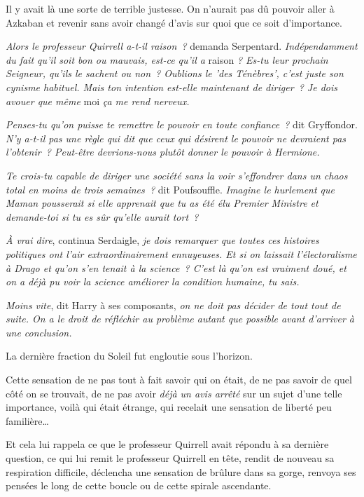 Il y avait là une sorte de terrible justesse. On n'aurait pas dû pouvoir aller à Azkaban et revenir sans avoir changé d'avis sur quoi que ce soit d'importance.

\emph{Alors le professeur Quirrell a-t-il raison~?} demanda Serpentard. \emph{Indépendamment du fait qu'il soit bon ou mauvais, est-ce qu'il a} raison \emph{? Es-tu leur prochain Seigneur, qu'ils le sachent ou non~? Oublions le 'des Ténèbres', c'est juste son cynisme habituel. Mais ton intention est-elle maintenant de diriger~? Je dois avouer que même} moi \emph{ça me rend nerveux.}

\emph{Penses-tu qu'on puisse te remettre le pouvoir en toute confiance~?} dit Gryffondor. \emph{N'y a-t-il pas une règle qui dit que ceux qui désirent le pouvoir ne devraient pas l'obtenir~? Peut-être devrions-nous plutôt donner le pouvoir à Hermione.}

\emph{Te crois-tu capable de diriger une société sans la voir s'effondrer dans un chaos total en moins de trois semaines~?} dit Poufsouffle. \emph{Imagine le hurlement que Maman pousserait si elle apprenait que tu as été élu Premier Ministre et demande-toi si tu es sûr qu'elle aurait tort~?}

\emph{À vrai dire}, continua Serdaigle, \emph{je dois remarquer que toutes ces histoires politiques ont l'air extraordinairement ennuyeuses. Et si on laissait l'électoralisme à Drago et qu'on s'en tenait à la science~? C'est là qu'on est vraiment doué, et on a déjà pu voir la science améliorer la condition humaine, tu sais.}

\emph{Moins vite}, dit Harry à ses composants, \emph{on ne doit pas décider de tout tout de suite. On a le droit de réfléchir au problème autant que possible avant d'arriver à une conclusion.}

La dernière fraction du Soleil fut engloutie sous l'horizon.

Cette sensation de ne pas tout à fait savoir qui on était, de ne pas savoir de quel côté on se trouvait, de ne pas avoir \emph{déjà un avis arrêté} sur un sujet d'une telle importance, voilà qui était étrange, qui recelait une sensation de liberté peu familière…

Et cela lui rappela ce que le professeur Quirrell avait répondu à sa dernière question, ce qui lui remit le professeur Quirrell en tête, rendit de nouveau sa respiration difficile, déclencha une sensation de brûlure dans sa gorge, renvoya ses pensées le long de cette boucle ou de cette spirale ascendante.

